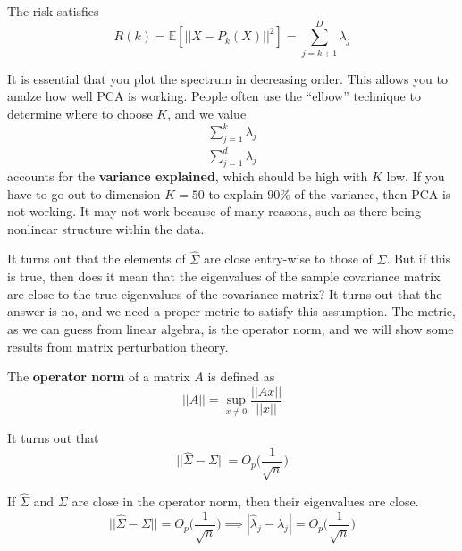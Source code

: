     \begin{theorem}[Risk]
      The risk satisfies 
      \begin{equation}
        R(k) = \mathbb{E}[|| X - P_k (X) ||^2 ] = \sum_{j=k+1}^D \lambda_j 
      \end{equation}
    \end{theorem}

    It is essential that you plot the spectrum in decreasing order. This allows you to analze how well PCA is working. People often use the ``elbow'' technique to determine where to choose $K$, and we value 
    \begin{equation}
      \frac{\sum_{j=1}^k \lambda_j}{\sum_{j=1}^d \lambda_j} 
    \end{equation}
    accounts for the \textbf{variance explained}, which should be high with $K$ low. If you have to go out to dimension $K=50$ to explain $90\%$ of the variance, then PCA is not working. It may not work because of many reasons, such as there being nonlinear structure within the data. 

    It turns out that the elements of $\hat{\Sigma}$ are close entry-wise to those of $\Sigma$. But if this is true, then does it mean that the eigenvalues of the sample covariance matrix are close to the true eigenvalues of the covariance matrix? It turns out that the answer is no, and we need a proper metric to satisfy this assumption. The metric, as we can guess from linear algebra, is the operator norm, and we will show some results from matrix perturbation theory. 

    \begin{definition}
      The \textbf{operator norm} of a matrix $A$ is defined as 
      \begin{equation}
        ||A|| = \sup_{x \neq 0} \frac{||Ax||}{||x||} 
      \end{equation}
    \end{definition}

    \begin{lemma}[]
      It turns out that 
      \begin{equation}
        ||\hat{\Sigma} - \Sigma|| = O_p \bigg( \frac{1}{\sqrt{n}} \bigg)
      \end{equation}
    \end{lemma}

    \begin{theorem}
      If $\hat{\Sigma}$ and $\Sigma$ are close in the operator norm, then their eigenvalues are close. 
      \begin{equation}
        ||\hat{\Sigma} - \Sigma|| = O_p \bigg( \frac{1}{\sqrt{n}} \bigg) \implies |\hat{\lambda}_j - \lambda_j| = O_p \bigg( \frac{1}{\sqrt{n}} \bigg) 
      \end{equation}
    \end{theorem}

